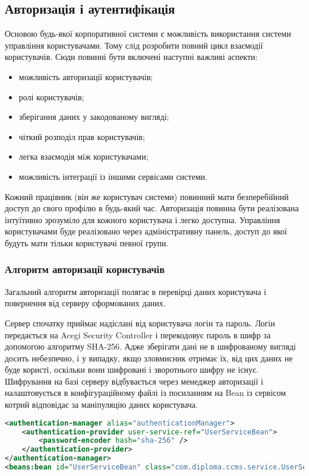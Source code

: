 \subsection{Авторизація і аутентифікація}\label{sec:authority}
Основою будь-якої корпоративної системи є можливість використання системи управління користувачами.
Тому слід розробити повний цикл взаємодії користувачів. Сюди повинні бути включені наступні важливі аспекти:
\begin{itemize}
	\item можливість авторизації користувачів;
	\item ролі користувачів;
	\item зберігання даних у закодованому вигляді;
	\item чіткий розподіл прав користувачів;
	\item легка взаємодія між користувачами;
	\item можливість інтеграції із іншими сервісами системи.
\end{itemize}

\par Кожний працівник (він же користувач системи) повинний мати безперебійний доступ до свого профілю в будь-який час.
Авторизація повинна бути реалізована інтуїтивно зрозуміло для кожного користувача і легко доступна.
Управління користувачами буде реалізовано через адміністративну панель, доступ до якої будуть мати тільки користувачі певної групи.

\subsubsection{Алгоритм авторизації користувачів}
Загальний алгоритм авторизації полягає в перевірці даних користувача і повернення від серверу сформованих даних.
\par Сервер спочатку приймає надіслані від користувача логін та пароль. Логін передається на Acegi Security Controller і перекодовує пароль в шифр за допомогою алгоритму SHA-256. Адже зберігати дані не в шифрованому вигляді досить небезпечно, і у випадку, якщо зловмисник отримає їх, від цих даних не буде користі, оскільки вони шифровані і зворотнього шифру не існує. Шифрування на базі серверу відбувається через менеджер авторизації і налаштовується в конфігураційному файлі із посиланням на Bean із сервісом котрий відповідає за маніпуляцію даних користувача.

\begin{lstlisting}[language=Xml]
<authentication-manager alias="authenticationManager">
	<authentication-provider user-service-ref="UserServiceBean">
		<password-encoder hash="sha-256" />
	</authentication-provider>
</authentication-manager>
<beans:bean id="UserServiceBean" class="com.diploma.ccms.service.UserService" />
\end{lstlisting}


